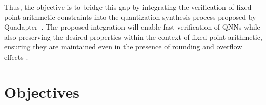 {Thus, the objective is to bridge this gap by integrating the verification of fixed-point arithmetic constraints into the quantization synthesis process proposed by Quadapter~\cite{cai2025certified}. The proposed integration will enable fast verification of QNNs while also preserving the desired properties within the context of fixed-point arithmetic, ensuring they are maintained even in the presence of rounding and overflow effects \cite{baranowski2020smt,giacobbe2020how}.}

\section{Objectives}\label{sec:objectives}



